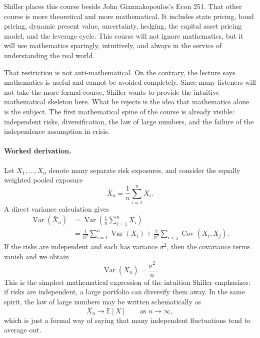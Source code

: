 Shiller places this course beside John Giannakopoulos's Econ 251. That other course is more theoretical and more mathematical. It includes state pricing, bond pricing, dynamic present value, uncertainty, hedging, the capital asset pricing model, and the leverage cycle. This course will not ignore mathematics, but it will use mathematics sparingly, intuitively, and always in the service of understanding the real world.

That restriction is not anti-mathematical. On the contrary, the lecture says mathematics is useful and cannot be avoided completely. Since many listeners will not take the more formal course, Shiller wants to provide the intuitive mathematical skeleton here. What he rejects is the idea that mathematics alone is the subject. The first mathematical spine of the course is already visible: independent risks, diversification, the law of large numbers, and the failure of the independence assumption in crisis.

\paragraph{Worked derivation.}
Let \(X_1,\ldots,X_n\) denote many separate risk exposures, and consider the equally weighted pooled exposure
\begin{equation}
\bar X_n=\frac{1}{n}\sum_{i=1}^n X_i.
\end{equation}
A direct variance calculation gives
\begin{align}
\operatorname{Var}(\bar X_n)
&=\operatorname{Var}\!\left(\frac{1}{n}\sum_{i=1}^n X_i\right) \\
&=\frac{1}{n^2}\sum_{i=1}^n \operatorname{Var}(X_i)
+\frac{2}{n^2}\sum_{i<j}\operatorname{Cov}(X_i,X_j).
\end{align}
If the risks are independent and each has variance \(\sigma^2\), then the covariance terms vanish and we obtain
\begin{equation}
\operatorname{Var}(\bar X_n)=\frac{\sigma^2}{n}.
\end{equation}
This is the simplest mathematical expression of the intuition Shiller emphasizes: if risks are independent, a large portfolio can diversify them away. In the same spirit, the law of large numbers may be written schematically as
\begin{equation}
\bar X_n \to \mathbb E[X]
\qquad \text{as } n\to\infty,
\end{equation}
which is just a formal way of saying that many independent fluctuations tend to average out.


